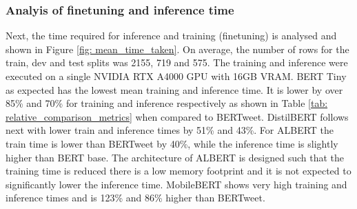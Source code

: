 \subsubsection{Analyis of finetuning and inference time}

Next, the time required for inference and training (finetuning) is analysed and shown in Figure \ref{fig: mean_time_taken}. On average, the number of rows for the train, dev and test splits was 2155, 719 and 575. The training and inference were executed on a single NVIDIA RTX A4000 GPU with 16GB VRAM. BERT Tiny as expected has the lowest mean training and inference time. It is lower by over 85\% and 70\% for training and inference respectively as shown in Table \ref{tab: relative_comparison_metrics} when compared to BERTweet. DistilBERT follows next with lower train and inference times by 51\% and 43\%. For ALBERT the train time is lower than BERTweet by 40\%, while the inference time is slightly higher than BERT base. The architecture of ALBERT is designed such that the training time is reduced there is a low memory footprint and it is not expected to significantly lower the inference time. MobileBERT shows very high training and inference times and is 123\% and 86\% higher than BERTweet.
